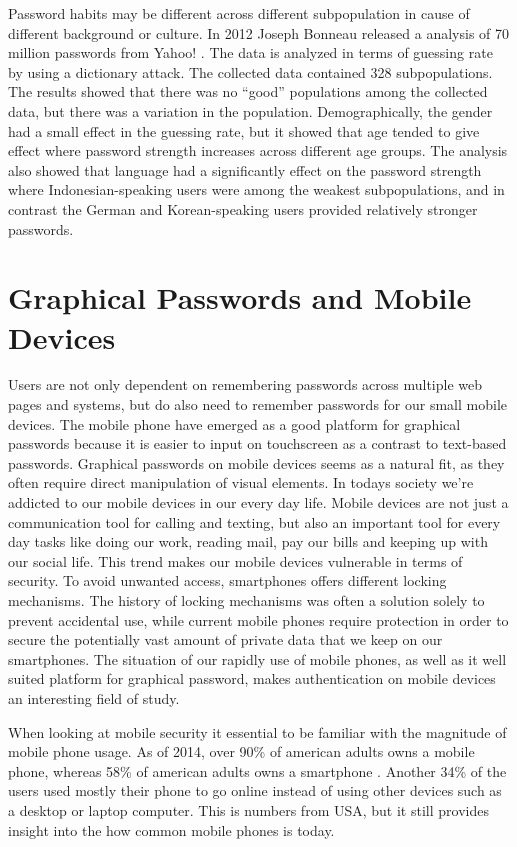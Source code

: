   Password habits may be different across different subpopulation in cause of different background or culture. In 2012 Joseph Bonneau released a analysis of 70 million passwords from Yahoo! \cite{Bonneau2}. The data is analyzed in terms of guessing rate by using a dictionary attack. The collected data contained 328 subpopulations. The results showed that there was no ``good'' populations among the collected data, but there was a variation in the population. Demographically, the gender had a small effect in the guessing rate, but it showed that age tended to give effect where password strength increases across different age groups. The analysis also showed that language had a significantly effect on the password strength where Indonesian-speaking users were among the weakest subpopulations, and in contrast the German and Korean-speaking users provided relatively stronger passwords. 

  

  \section{Graphical Passwords and Mobile Devices}
  Users are not only dependent on remembering passwords across multiple web pages and systems, but do also need to remember passwords for our small mobile devices. The mobile phone have emerged as a good platform for graphical passwords because it is easier to input on touchscreen as a contrast to text-based passwords. Graphical passwords on mobile devices seems as a natural fit, as they often require direct manipulation of visual elements. In todays society we're addicted to our mobile devices in our every day life. Mobile devices are not just a communication tool for calling and texting, but also an important tool for every day tasks like doing our work, reading mail, pay our bills and keeping up with our social life. This trend makes our mobile devices vulnerable in terms of security. To avoid unwanted access, smartphones offers different locking mechanisms. The history of locking mechanisms was often a solution solely to prevent accidental use, while current mobile phones require protection in order to secure the potentially vast amount of private data that we keep on our smartphones. The situation of our rapidly use of mobile phones, as well as it well suited platform for graphical password, makes authentication on mobile devices an interesting field of study.

  When looking at mobile security it essential to be familiar with the magnitude of mobile phone usage. As of 2014, over 90\% of american adults owns a mobile phone, whereas 58\% of american adults owns a smartphone \cite{MobileUseage}. Another 34\% of the users used mostly their phone to go online instead of using other devices such as a desktop or laptop computer. This is numbers from USA, but it still provides insight into the how common mobile phones is today.

